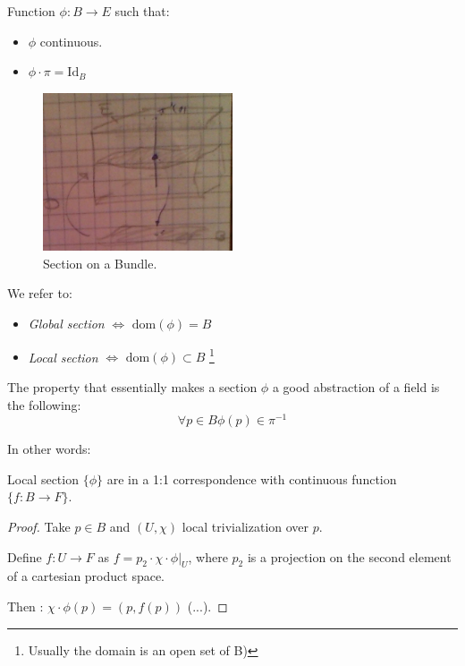\documentclass[a4paper,12pt]{scrartcl}    %
\begin{document}
\begin{definition}
Function $\phi : B \rightarrow E$ such that:
\begin{itemize}
\item $\phi$ continuous.
\item $\phi \cdot \pi = \textrm{Id}_{B}$ 
\end{itemize}
\end{definition}

\begin{figure}[h!]
  \caption{Section on a Bundle.}
  	\includegraphics[width=0.5\textwidth]{TempPictures/CrossSection.jpg}
  \centering
\end{figure}

\begin{notationfix}
We refer to:
\begin{itemize}
\item \emph{Global section} $\Leftrightarrow$ $\textrm{dom}(\phi) = B$
\item \emph{Local section} $\Leftrightarrow$ $\textrm{dom}(\phi) \subset B$ \footnote{Usually the domain is an open set of B)}
\end{itemize}
\end{notationfix}

\begin{observation}
The property that essentially makes a section $\phi$ a good abstraction of a field is the following:
\begin{displaymath}
\forall p \in B \phi(p) \in \pi^{-1}
\end{displaymath}
\end{observation}

In other words:
\begin{proposition}
Local section $\{\phi \}$ are in a 1:1 correspondence with continuous function $\{ f: B \rightarrow F \} $.
\end{proposition}
\begin{proof}


Take $p\in B$ and $(U,\chi)$ local trivialization over $p$.

Define $f: U \rightarrow F$ as $f= p_{2} \cdot \chi \cdot \phi \vert_{U}$, where $p_{2}$ is a projection on the second element of a cartesian product space.

Then : $\chi \cdot \phi (p) = ( p, f(p) )$ (...).

\end{proof}
\end{document}
